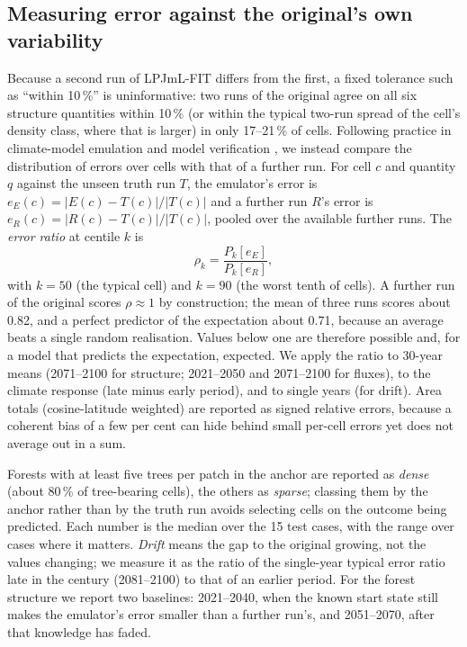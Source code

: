 \documentclass[11pt,a4paper]{article}
\begin{document}
\subsection{Measuring error against the original's own variability}

Because a second run of LPJmL-FIT differs from the first, a fixed tolerance such as ``within 10\,\%'' is uninformative:
two runs of the original agree on all six structure quantities within 10\,\% (or within the typical two-run spread of
the cell's density class, where that is larger) in only 17--21\,\% of cells. Following practice in climate-model
emulation and model verification \citep{WatsonParris2022,Baker2015,Lutjens2025}, we instead compare the distribution of
errors over cells with that of a further run. For cell $c$ and quantity $q$ against the unseen truth run $T$, the
emulator's error is $e_E(c)=|E(c)-T(c)|/|T(c)|$ and a further run $R$'s error is $e_R(c)=|R(c)-T(c)|/|T(c)|$, pooled
over the available further runs. The \emph{error ratio} at centile $k$ is
\begin{equation}
  \rho_k = \frac{P_k\left[e_E\right]}{P_k\left[e_R\right]},
\end{equation}
with $k=50$ (the typical cell) and $k=90$ (the worst tenth of cells). A further run of the original scores
$\rho\approx1$ by construction; the mean of three runs scores about 0.82, and a perfect predictor of the expectation
about 0.71, because an average beats a single random realisation. Values below one are therefore possible and, for a
model that predicts the expectation, expected. We apply the ratio to 30-year means (2071--2100 for structure;
2021--2050 and 2071--2100 for fluxes), to the climate response (late minus early period), and to single years (for
drift). Area totals (cosine-latitude weighted) are reported as signed relative errors, because a coherent bias of a few
per cent can hide behind small per-cell errors yet does not average out in a sum.

Forests with at least five trees per patch in the anchor are reported as \emph{dense} (about 80\,\% of tree-bearing
cells), the others as \emph{sparse}; classing them by the anchor rather than by the truth run avoids selecting cells on
the outcome being predicted. Each number is the median over the 15 test cases, with the range over cases where it
matters. \emph{Drift} means the gap to the original growing, not the values changing; we measure it as the ratio of the
single-year typical error ratio late in the century (2081--2100) to that of an earlier period. For the forest
structure we report two baselines: 2021--2040, when the known start state still makes the emulator's error smaller than
a further run's, and 2051--2070, after that knowledge has faded.
\end{document}

